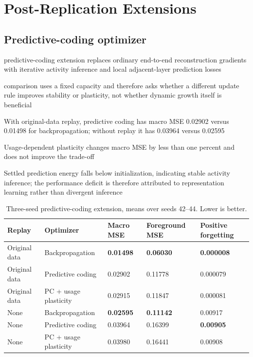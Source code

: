 \section{Post-Replication Extensions}

\subsection{Predictive-coding optimizer}
\begin{draftpoints}
  \item predictive-coding extension replaces ordinary end-to-end reconstruction gradients with iterative activity inference and local adjacent-layer prediction losses
  \item comparison uses a fixed capacity and therefore asks whether a different update rule improves stability or plasticity, not whether dynamic growth itself is beneficial
  \item With original-data replay, predictive coding has macro MSE 0.02902 versus 0.01498 for backpropagation; without replay it has 0.03964 versus 0.02595
  \item Usage-dependent plasticity changes macro MSE by less than one percent and does not improve the trade-off
  \item Settled prediction energy falls below initialization, indicating stable activity inference; the performance deficit is therefore attributed to representation learning rather than divergent inference
\end{draftpoints}

\begin{table}[htbp]
\centering
\caption{Three-seed predictive-coding extension, means over seeds 42--44. Lower is better.}
\label{tab:predictive-coding-results}
\small
\begin{tabularx}{\textwidth}{p{2.5cm}Yp{2.0cm}p{2.1cm}p{2.2cm}}
\toprule
Replay & Optimizer & Macro MSE & Foreground MSE & Positive forgetting \\
\midrule
Original data & Backpropagation & \textbf{0.01498} & \textbf{0.06030} & \textbf{0.000008} \\
Original data & Predictive coding & 0.02902 & 0.11778 & 0.000079 \\
Original data & PC + usage plasticity & 0.02915 & 0.11847 & 0.000081 \\
None & Backpropagation & \textbf{0.02595} & \textbf{0.11142} & 0.00917 \\
None & Predictive coding & 0.03964 & 0.16399 & \textbf{0.00905} \\
None & PC + usage plasticity & 0.03980 & 0.16441 & 0.00908 \\
\bottomrule
\end{tabularx}
\end{table}

